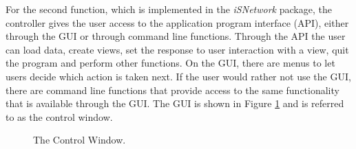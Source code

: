 \documentclass{article}[11pt]
\newcommand{\Rpackage}[1]{{\textit{#1}}}
\begin{document}
For the second function, which is implemented in the \Rpackage{iSNetwork}
package, the controller gives the user access to the application program
interface (API), either through the GUI or through command line functions.
Through the API the user can load data, create views, set the response to user
interaction with a view, quit the program and perform other functions.  On the
GUI, there are menus to let users decide which action is taken next.  If
the user would rather not use the GUI, there are command line functions that
provide access to the same functionality that is available through the GUI.
The GUI is shown in Figure \ref{Fig:ContWin} and is referred to as the
control window.

\begin{figure}[ht]
  \begin{center}
    \caption{ The Control Window. }
    \label{Fig:ContWin}
  \end{center}
\end{figure}
\end{document}
